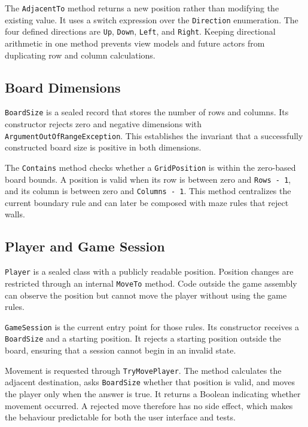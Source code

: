 The \texttt{AdjacentTo} method returns a new position rather than modifying the existing value. It uses a switch expression over the \texttt{Direction} enumeration. The four defined directions are \texttt{Up}, \texttt{Down}, \texttt{Left}, and \texttt{Right}. Keeping directional arithmetic in one method prevents view models and future actors from duplicating row and column calculations.

\subsection{Board Dimensions}

\texttt{BoardSize} is a sealed record that stores the number of rows and columns. Its constructor rejects zero and negative dimensions with \texttt{ArgumentOutOfRangeException}. This establishes the invariant that a successfully constructed board size is positive in both dimensions.

The \texttt{Contains} method checks whether a \texttt{GridPosition} is within the zero-based board bounds. A position is valid when its row is between zero and \texttt{Rows - 1}, and its column is between zero and \texttt{Columns - 1}. This method centralizes the current boundary rule and can later be composed with maze rules that reject walls.

\subsection{Player and Game Session}

\texttt{Player} is a sealed class with a publicly readable position. Position changes are restricted through an internal \texttt{MoveTo} method. Code outside the game assembly can observe the position but cannot move the player without using the game rules.

\texttt{GameSession} is the current entry point for those rules. Its constructor receives a \texttt{BoardSize} and a starting position. It rejects a starting position outside the board, ensuring that a session cannot begin in an invalid state.

Movement is requested through \texttt{TryMovePlayer}. The method calculates the adjacent destination, asks \texttt{BoardSize} whether that position is valid, and moves the player only when the answer is true. It returns a Boolean indicating whether movement occurred. A rejected move therefore has no side effect, which makes the behaviour predictable for both the user interface and tests.

